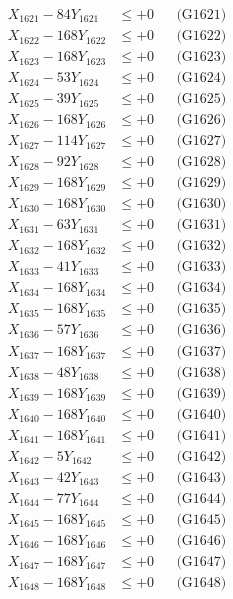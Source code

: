 \documentclass[a4paper,10pt]{article}
\begin{document}
{\begin{align}
\allowbreak
X_{1621} - 84Y_{1621} &\leq +0 && \text{(G1621)} \\
X_{1622} - 168Y_{1622} &\leq +0 && \text{(G1622)} \\
X_{1623} - 168Y_{1623} &\leq +0 && \text{(G1623)} \\
X_{1624} - 53Y_{1624} &\leq +0 && \text{(G1624)} \\
X_{1625} - 39Y_{1625} &\leq +0 && \text{(G1625)} \\
X_{1626} - 168Y_{1626} &\leq +0 && \text{(G1626)} \\
X_{1627} - 114Y_{1627} &\leq +0 && \text{(G1627)} \\
X_{1628} - 92Y_{1628} &\leq +0 && \text{(G1628)} \\
X_{1629} - 168Y_{1629} &\leq +0 && \text{(G1629)} \\
X_{1630} - 168Y_{1630} &\leq +0 && \text{(G1630)} \\
\allowbreak
X_{1631} - 63Y_{1631} &\leq +0 && \text{(G1631)} \\
X_{1632} - 168Y_{1632} &\leq +0 && \text{(G1632)} \\
X_{1633} - 41Y_{1633} &\leq +0 && \text{(G1633)} \\
X_{1634} - 168Y_{1634} &\leq +0 && \text{(G1634)} \\
X_{1635} - 168Y_{1635} &\leq +0 && \text{(G1635)} \\
X_{1636} - 57Y_{1636} &\leq +0 && \text{(G1636)} \\
X_{1637} - 168Y_{1637} &\leq +0 && \text{(G1637)} \\
X_{1638} - 48Y_{1638} &\leq +0 && \text{(G1638)} \\
X_{1639} - 168Y_{1639} &\leq +0 && \text{(G1639)} \\
X_{1640} - 168Y_{1640} &\leq +0 && \text{(G1640)} \\
\allowbreak
X_{1641} - 168Y_{1641} &\leq +0 && \text{(G1641)} \\
X_{1642} - 5Y_{1642} &\leq +0 && \text{(G1642)} \\
X_{1643} - 42Y_{1643} &\leq +0 && \text{(G1643)} \\
X_{1644} - 77Y_{1644} &\leq +0 && \text{(G1644)} \\
X_{1645} - 168Y_{1645} &\leq +0 && \text{(G1645)} \\
X_{1646} - 168Y_{1646} &\leq +0 && \text{(G1646)} \\
X_{1647} - 168Y_{1647} &\leq +0 && \text{(G1647)} \\
X_{1648} - 168Y_{1648} &\leq +0 && \text{(G1648)} \\

\end{align}}
\end{document}
